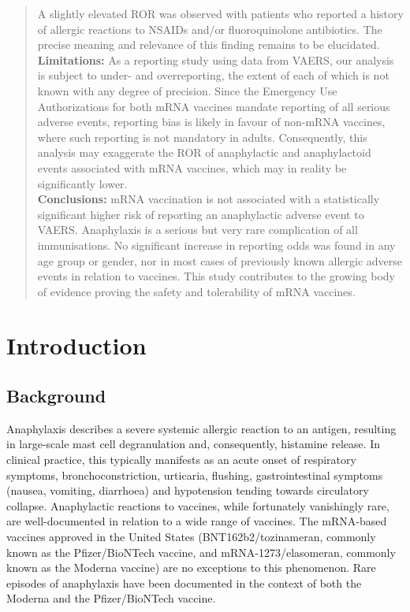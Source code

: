 \documentclass{article}
\begin{document}
\begin{abstract}
        A slightly elevated ROR was observed with patients who reported a history of allergic reactions to NSAIDs and/or fluoroquinolone antibiotics.
        The precise meaning and relevance of this finding remains to be elucidated.\\
    \textbf{Limitations:}
        As a reporting study using data from VAERS, our analysis is subject to under- and overreporting, the extent of each of which is not known with any degree of precision.
        Since the Emergency Use Authorizations for both mRNA vaccines mandate reporting of all serious adverse events, reporting bias is likely in favour of non-mRNA vaccines, where such reporting is not mandatory in adults.
        Consequently, this analysis may exaggerate the ROR of anaphylactic and anaphylactoid events associated with mRNA vaccines, which may in reality be significantly lower. \\
    \textbf{Conclusions:}
        mRNA vaccination is not associated with a statistically significant higher risk of reporting an anaphylactic adverse event to VAERS.
        Anaphylaxis is a serious but very rare complication of all immunisations.
        No significant increase in reporting odds was found in any age group or gender, nor in most cases of previously known allergic adverse events in relation to vaccines.
        This study contributes to the growing body of evidence proving the safety and tolerability of mRNA vaccines.
\end{abstract}

\section{Introduction}

\subsection{Background}

Anaphylaxis describes a severe systemic allergic reaction to an antigen, resulting in large-scale mast cell degranulation and, consequently, histamine release.\cite{metcalfe2009mechanisms}
In clinical practice, this typically manifests as an acute onset of respiratory symptoms, bronchoconstriction, urticaria, flushing, gastrointestinal symptoms (nausea, vomiting, diarrhoea) and hypotension tending towards circulatory collapse.\cite{lee2011anaphylaxis}
Anaphylactic reactions to vaccines, while fortunately vanishingly rare, are well-documented in relation to a wide range of vaccines.\cite{su2019anaphylaxis,kelso1999anaphylaxis,kelso1993anaphylaxis,nagao2016highly}
The mRNA-based vaccines approved in the United States (BNT162b2/tozinameran, commonly known as the Pfizer/BioNTech vaccine, and mRNA-1273/elasomeran, commonly known as the Moderna vaccine) are no exceptions to this phenomenon.
Rare episodes of anaphylaxis have been documented in the context of both the Moderna\cite{covid2021allergicmoderna} and the Pfizer/BioNTech vaccine.\cite{shimabukuro2021allergic}
\end{document}
